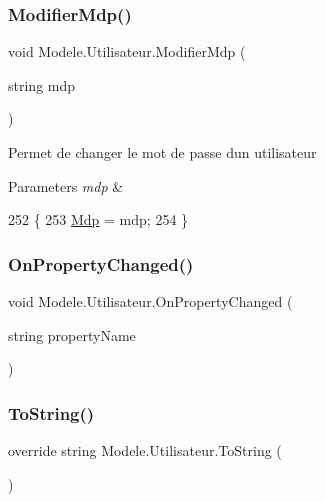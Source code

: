 \subsubsection{\texorpdfstring{Modifier\+Mdp()}{ModifierMdp()}}
{\footnotesize\ttfamily void Modele.\+Utilisateur.\+Modifier\+Mdp (\begin{DoxyParamCaption}\item[{string}]{mdp }\end{DoxyParamCaption})\hspace{0.3cm}{\ttfamily [inline]}}



Permet de changer le mot de passe d\textquotesingle{}un utilisateur 


\begin{DoxyParams}{Parameters}
{\em mdp} & \\
\hline
\end{DoxyParams}

\begin{DoxyCode}
252         \{
253             \hyperlink{classModele_1_1Utilisateur_a6da26e59e09412a036824cf27dac6976}{Mdp} = mdp;
254         \}
\end{DoxyCode}
\mbox{\label{classModele_1_1Utilisateur_a19ff1cdd2811be2589e2e160ad0b5181}} 
\subsubsection{\texorpdfstring{On\+Property\+Changed()}{OnPropertyChanged()}}
{\footnotesize\ttfamily void Modele.\+Utilisateur.\+On\+Property\+Changed (\begin{DoxyParamCaption}\item[{string}]{property\+Name }\end{DoxyParamCaption})\hspace{0.3cm}{\ttfamily [protected]}}

\mbox{\label{classModele_1_1Utilisateur_a268b6910465dc0d12768330b2067d12f}} 
\subsubsection{\texorpdfstring{To\+String()}{ToString()}}
{\footnotesize\ttfamily override string Modele.\+Utilisateur.\+To\+String (\begin{DoxyParamCaption}{ }\end{DoxyParamCaption})\hspace{0.3cm}{\ttfamily [inline]}}



